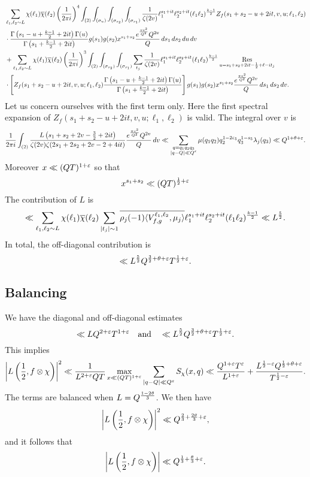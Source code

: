 \documentclass[12pt,reqno,oneside]{amsart}
\begin{document}
    \begin{align*}
      &\sum_{\ell_{1},\ell_{2} \sim L}\chi(\ell_{1})\overline{\chi}(\ell_{2})\left(\frac{1}{2\pi i}\right)^{4}\int_{(2)}\int_{(\sigma_{u})}\int_{(\sigma_{s_{2}})}\int_{(\sigma_{s_{1}})}\frac{1}{\zeta(2v)}\ell_{1}^{s_{1}+it}\ell_{2}^{s_{2}+it}(\ell_{1}\ell_{2})^{\frac{k-1}{2}}Z_{f}(s_{1}+s_{2}-u+2it,v,u;\ell_{1},\ell_{2}) \\
      &\cdot \frac{\Gamma\left(s_{1}-u+\frac{k-1}{2}+2it\right)\Gamma(u)}{\Gamma\left(s_{1}+\frac{k-1}{2}+2it\right)}g(s_{1})g(s_{2})x^{s_{1}+s_{2}}\frac{e^{\frac{\pi v^{2}}{Q^{2}}}Q^{2v}}{Q}\,ds_{1}\,ds_{2}\,du\,dv \\
      &+ \sum_{\ell_{1},\ell_{2} \sim L}\chi(\ell_{1})\overline{\chi}(\ell_{2})\left(\frac{1}{2\pi i}\right)^{3}\int_{(2)}\int_{(\sigma_{s_{2}})}\int_{(\sigma_{s_{1}})}\sum_{t_{j}}\frac{1}{\zeta(2v)}\ell_{1}^{s_{1}+it}\ell_{2}^{s_{2}+it}(\ell_{1}\ell_{2})^{\frac{k-1}{2}}\operatorname*{\mathrm{Res}}_{u = s_{1}+s_{2}+2it-\frac{1}{2}+\ell-it_{j}} \\
      &\cdot \left[Z_{f}(s_{1}+s_{2}-u+2it,v,u;\ell_{1},\ell_{2})\frac{\Gamma\left(s_{1}-u+\frac{k-1}{2}+2it\right)\Gamma(u)}{\Gamma\left(s_{1}+\frac{k-1}{2}+2it\right)}\right]g(s_{1})g(s_{2})x^{s_{1}+s_{2}}\frac{e^{\frac{\pi v^{2}}{Q^{2}}}Q^{2v}}{Q}\,ds_{1}\,ds_{2}\,dv.
    \end{align*}
    Let us concern ourselves with the first term only. Here the first spectral expansion of $Z_{f}(s_{1}+s_{2}-u+2it,v,u;\ell_{1},\ell_{2})$ is valid. The integral over $v$ is
    \[
      \frac{1}{2\pi i}\int_{(2)}\frac{L\left(s_{1}+s_{2}+2v-\frac{3}{2}+2it\right)}{\zeta(2v)\zeta(2s_{1}+2s_{2}+2v-2+4it)}\frac{e^{\frac{\pi v^{2}}{Q^{2}}}Q^{2v}}{Q}\,dv \ll \sum_{\substack{q = q_{1}q_{2}q_{3} \\ |q-Q| \ll Q^{\varepsilon}}}\mu(q_{1}q_{2})q_{2}^{1-2\varepsilon_{5}}q_{3}^{1-s_{5}}\lambda_{j}(q_{3}) \ll Q^{1+\theta+\varepsilon}.
    \]
    Moreover $x \ll (QT)^{1+\varepsilon}$ so that
    \[
      x^{s_{1}+s_{2}} \ll (QT)^{\frac{1}{2}+\varepsilon}
    \]
    The contribution of $L$ is
    \[
      \ll \sum_{\ell_{1},\ell_{2} \sim L}\chi(\ell_{1})\overline{\chi}(\ell_{2})\sum_{|t_{j}| \sim 1}\overline{\rho_{j}(-1)\langle V_{f,g}^{\ell_{1},\ell_{2}},\mu_{j}\rangle}\ell_{1}^{s_{1}+it}\ell_{2}^{s_{2}+it}(\ell_{1}\ell_{2})^{\frac{k-1}{2}} \ll L^{\frac{5}{2}}.
    \]
    In total, the off-diagonal contribution is
    \[
      \ll L^{\frac{5}{2}}Q^{\frac{3}{2}+\theta+\varepsilon}T^{\frac{1}{2}+\varepsilon}.
    \]
  \subsection*{Balancing}
    We have the diagonal and off-diagonal estimates
    \[
      \ll LQ^{2+\varepsilon}T^{1+\varepsilon} \quad \text{and} \quad \ll L^{\frac{5}{2}}Q^{\frac{3}{2}+\theta+\varepsilon}T^{\frac{1}{2}+\varepsilon}.
    \]
    This implies
    \[
      \left|L\left(\frac{1}{2},f \otimes \chi \right)\right|^{2} \ll \frac{1}{L^{2+\varepsilon}QT}\max_{x \ll (QT)^{1+\varepsilon}}\sum_{|q-Q| \ll Q^{\varepsilon}}S_{\chi}(x,q) \ll \frac{Q^{1+\varepsilon}T^{\varepsilon}}{L^{1+\varepsilon}}+\frac{L^{\frac{1}{2}-\varepsilon}Q^{\frac{1}{2}+\theta+\varepsilon}}{T^{\frac{1}{2}-\varepsilon}}.
    \]
    The terms are balanced when $L = Q^{\frac{1-2\theta}{3}}$. We then have
    \[
      \left|L\left(\frac{1}{2},f \otimes \chi \right)\right|^{2} \ll Q^{\frac{2}{3}+\frac{2\theta}{3}+\varepsilon},
    \]
    and it follows that
    \[
      \left|L\left(\frac{1}{2},f \otimes \chi \right)\right| \ll Q^{\frac{1}{3}+\frac{\theta}{3}+\varepsilon}.
    \]
 
\end{document}
